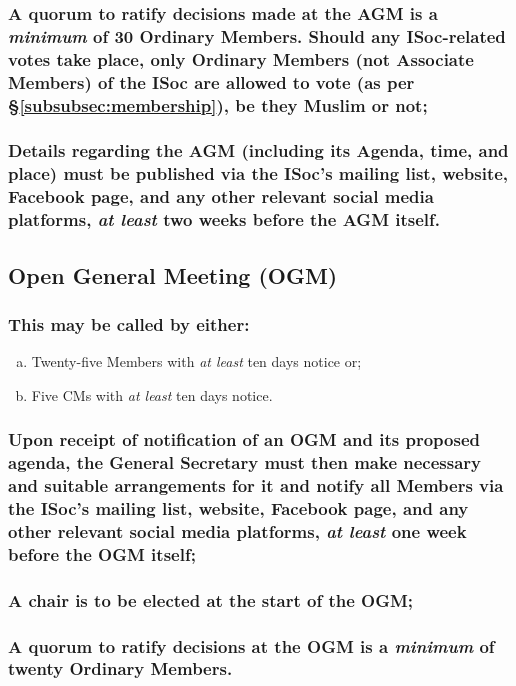 \documentclass[12pt]{article}
\begin{document}
\subsubsection{A quorum to ratify decisions made at the AGM is a \emph{minimum} of 30 Ordinary Members. Should any ISoc-related votes take place, only Ordinary Members (not Associate Members) of the ISoc are allowed to vote (as per \S\ref{subsubsec:membership}), be they Muslim or not;}
\subsubsection{Details regarding the AGM (including its Agenda, time, and place) must be published via the ISoc's mailing list, website, Facebook page, and any other relevant social media platforms, \emph{at least} two weeks before the AGM itself.}

\subsection{Open General Meeting (OGM)}
\label{subsec:ogm}
\subsubsection{This may be called by either:}
\begin{displayquote}
\begin{enumerate}[a.]
\item Twenty-five Members with \emph{at least} ten days notice or;
\item Five CMs with \emph{at least} ten days notice.
\end{enumerate}
\end{displayquote}
\subsubsection{Upon receipt of notification of an OGM and its proposed agenda, the General Secretary must then make necessary and suitable arrangements for it and notify all Members via the ISoc's mailing list, website, Facebook page, and any other relevant social media platforms, \emph{at least} one week before the OGM itself;}
\subsubsection{A chair is to be elected at the start of the OGM;}
\subsubsection{A quorum to ratify decisions at the OGM is a \emph{minimum} of twenty Ordinary Members.}
\end{document}

